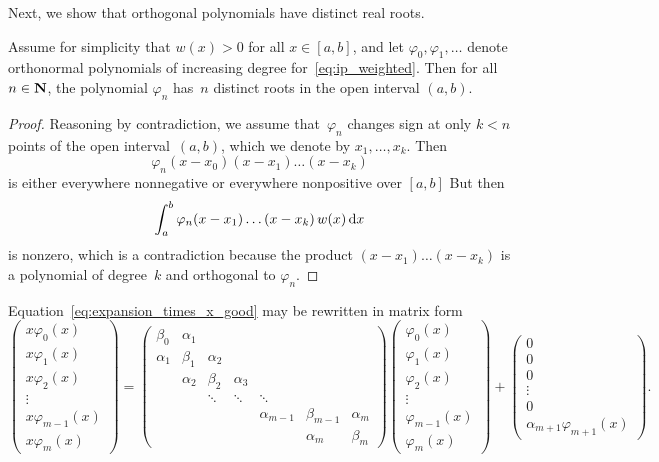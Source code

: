 Next,
we show that orthogonal polynomials have distinct real roots.
\begin{proposition}
    Assume for simplicity that $w(x) > 0$ for all $x \in [a, b]$,
    and let $\varphi_0, \varphi_1, \dotsc$ denote orthonormal polynomials of increasing degree for~\eqref{eq:ip_weighted}.
    Then for all $n \in \mathbf N$,
    the polynomial $\varphi_n$ has~$n$ distinct roots in the open interval $(a, b)$.
\end{proposition}
\begin{proof}
    Reasoning by contradiction,
    we assume that~$\varphi_n$ changes sign at only $k < n$ points of the open interval~$(a, b)$,
    which we denote by $x_1, \dotsc, x_k$.
    Then
    \[
        \varphi_n (x - x_0) (x - x_1) \dotsc (x - x_k)
    \]
    is either everywhere nonnegative or everywhere nonpositive over $[a, b]$
    But then
    \[
        \int_{a}^{b} \varphi_n (x - x_1)  \dotsc (x - x_k) \, w(x) \, \mathrm d x
    \]
    is nonzero,
    which is a contradiction because the product $(x-x_1) \dotsc (x-x_k)$ is a polynomial of degree~$k$
    and orthogonal to $\varphi_n$.
\end{proof}

Equation~\eqref{eq:expansion_times_x_good} may be rewritten in matrix form
\[
    \begin{pmatrix}
        x \varphi_0(x) \\
        x \varphi_1(x) \\
        x \varphi_2(x) \\
        \vdots \\
        x \varphi_{m-1}(x) \\
        x \varphi_m(x)
    \end{pmatrix}
    =
    \begin{pmatrix}
        \beta_0 & \alpha_1 \\
        \alpha_1 & \beta_1 & \alpha_2 \\
                 & \alpha_2 & \beta_2 & \alpha_3 \\
                 & & \ddots & \ddots & \ddots \\
                 & & & & \alpha_{m-1} & \beta_{m-1} & \alpha_m \\
                 & & & & & \alpha_m & \beta_m
    \end{pmatrix}
    \begin{pmatrix}
        \varphi_0(x) \\
        \varphi_1(x) \\
        \varphi_2(x) \\
        \vdots \\
        \varphi_{m-1}(x) \\
        \varphi_m(x)
    \end{pmatrix}
    +
    \begin{pmatrix}
        0 \\
        0 \\
        0 \\
        \vdots \\
        0 \\
        \alpha_{m+1} \varphi_{m+1}(x)
    \end{pmatrix}.
\]

